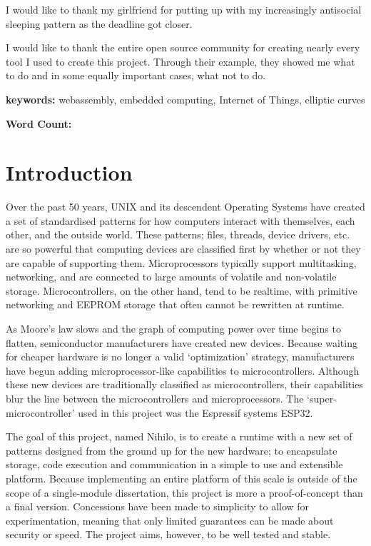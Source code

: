 \documentclass{article}
\begin{document}
I would like to thank my girlfriend for putting up with my increasingly antisocial sleeping pattern as the deadline got closer.

I would like to thank the entire open source community for creating nearly every tool I used to create this project. Through their example, they showed me what to do and in some equally important cases, what not to do.

\textbf{keywords:} webassembly, embedded computing, Internet of Things, elliptic curves

\textbf{Word Count:}
\pagebreak

\tableofcontents
\listoffigures
\listoftables
\section{Introduction}
Over the past 50 years, UNIX and its descendent Operating Systems have created a set of standardised patterns for how computers interact with themselves, each other, and the outside world.
These patterns; files, threads, device drivers, etc. are so powerful that computing devices are classified first by whether or not they are capable of supporting them.
Microprocessors typically support multitasking, networking, and are connected to large amounts of volatile and non-volatile storage.
Microcontrollers, on the other hand, tend to be realtime, with primitive networking and EEPROM storage that often cannot be rewritten at runtime.

As Moore's law slows and the graph of computing power over time begins to flatten, semiconductor manufacturers have created new devices.
Because waiting for cheaper hardware is no longer a valid \lq optimization' strategy, manufacturers have begun adding microprocessor-like capabilities to microcontrollers.
Although these new devices are traditionally classified as microcontrollers, their capabilities blur the line between the microcontrollers and microprocessors.
The \lq super-microcontroller' used in this project was the Espressif systems ESP32.

The goal of this project, named Nihilo, is to create a runtime with a new set of patterns designed from the ground up for the new hardware; to encapsulate storage, code execution and communication in a simple to use and extensible platform.
Because implementing an entire platform of this scale is outside of the scope of a single-module dissertation, this project is more a proof-of-concept than a final version.
Concessions have been made to simplicity to allow for experimentation, meaning that only limited guarantees can be made about security or speed.
The project aims, however, to be well tested and stable.
\end{document}

